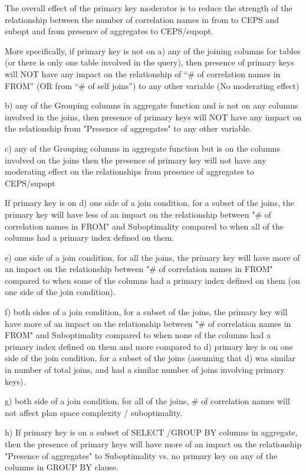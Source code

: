 The overall effect of the primary key moderator is to reduce the strength 
of the relationship between the number of correlation names in from to 
CEPS and subopt and from presence of aggregates to CEPS/supopt.

More specifically, if primary key is not on 
a) any of the joining columns for tables (or there is only one table 
involved in the query), then presence of primary keys will NOT have any 
impact on the relationship of ``\# of correlation names in FROM'' (OR from 
``\# of self joins'') to any other variable (No moderating effect)

b) any of the Grouping columns in aggregate function and is not on any 
columns involved in the joins, then presence of primary keys will NOT 
have any impact on the relationship from "Presence of aggregates" to 
any other variable.

c) any of the Grouping columns in aggregate function but is on the 
columns involved on the joins then the presence of primary key will 
not have any moderating effect on the relationships from presence of 
aggregates to CEPS/supopt

If primary key is on 
d) one side of a join condition, for a subset of the joins, the 
primary key will have less of an impact on the relationship between 
"\# of correlation names in FROM" and Suboptimality compared to when 
all of the columns had a primary index defined on them. 

e) one side of a join condition, for all the joins, the primary key 
will have more of an impact on the relationship between "\# of correlation 
names in FROM" compared to when some of the columns had a primary index 
defined on them (on one side of the join condition). 

f) both sides of a join condition, for a subset of the joins, the primary 
key will have more of an impact on the relationship between "\# of 
correlation names in FROM" and Suboptimality compared to when none of 
the columns had a primary index defined on them and more compared to d) 
primary key is on one side of the join condition, for a subset of the 
joins (assuming that d) was similar in number of total joins, and had a 
similar number of joins involving primary keys). 

g) both side of a join condition, for all of the joins, \# of correlation 
names will not affect plan space complexity / suboptimality. 

h) If primary key is on a subset of SELECT /GROUP BY columns in aggregate, 
then the presence of primary keys will have more of an impact on the 
relationship "Presence of aggregates" to Suboptimality vs. no primary 
key on any of the columns in GROUP BY clause.

